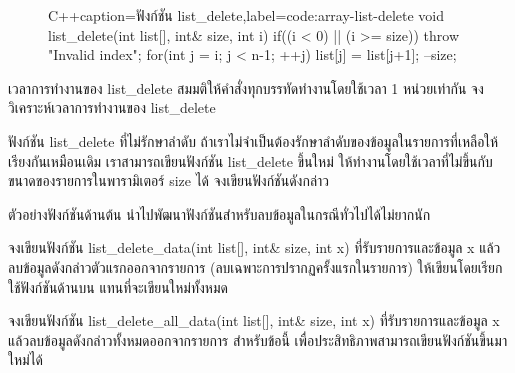 \begin{figure}
\latintext
\begin{codelist}{C++}{caption={\thaitext ฟังก์ชัน {\ct list\_delete}\latintext},label=code:array-list-delete}
void list_delete(int list[], int& size, int i)
{
  if((i < 0) || (i >= size))
    throw "Invalid index";
  for(int j = i; j < n-1; ++j)
    list[j] = list[j+1];
  --size;
}
\end{codelist}
\thaitext
\end{figure}

\begin{quiz}{เวลา{\wbr}การ{\wbr}ทำงาน{\wbr}ของ {\ct list\_delete}}
สมมติ{\wbr}ให้{\wbr}คำ{\wbr}สั่ง{\wbr}ทุก{\wbr}บรรทัด{\wbr}ทำงาน{\wbr}โดย{\wbr}ใช้{\wbr}เวลา 1 หน่วย{\wbr}เท่า{\wbr}กัน จง{\wbr}วิเคราะห์{\wbr}เวลา{\wbr}การ{\wbr}ทำงาน{\wbr}ของ{\wbr}
{\ct list\_delete} 
\end{quiz}

\begin{quiz}{ฟังก์ชัน {\ct list\_delete} ที่{\wbr}ไม่{\wbr}รักษา{\wbr}ลำดับ}
ถ้า{\wbr}เรา{\wbr}ไม่{\wbr}จำเป็น{\wbr}ต้อง{\wbr}รักษา{\wbr}ลำดับ{\wbr}ของ{\wbr}ข้อมูล{\wbr}ใน{\wbr}รายการ{\wbr}ที่{\wbr}เหลือ{\wbr}ให้{\wbr}เรียง{\wbr}กัน{\wbr}เหมือน{\wbr}เดิม{\wbr}
เรา{\wbr}สามารถ{\wbr}เขียน{\wbr}ฟังก์ชัน {\ct list\_delete} ขึ้น{\wbr}ใหม่{\wbr}
ให้{\wbr}ทำงาน{\wbr}โดย{\wbr}ใช้{\wbr}เวลา{\wbr}ที่{\wbr}ไม่{\wbr}ขึ้น{\wbr}กับ{\wbr}ขนาด{\wbr}ของ{\wbr}รายการ{\wbr}ใน{\wbr}พารามิเตอร์ {\ct size} ได้{\wbr}
จง{\wbr}เขียน{\wbr}ฟังก์ชัน{\wbr}ดัง{\wbr}กล่าว{\wbr}
\end{quiz}

ตัวอย่าง{\wbr}ฟังก์ชัน{\wbr}ด้าน{\wbr}ต้น นำ{\wbr}ไป{\wbr}พัฒนา{\wbr}ฟังก์ชัน{\wbr}สำหรับ{\wbr}ลบ{\wbr}ข้อมูล{\wbr}ใน{\wbr}กรณี{\wbr}ทั่วไป{\wbr}ได้{\wbr}ไม่{\wbr}ยาก{\wbr}นัก{\wbr}

\begin{quiz}{}
จง{\wbr}เขียน{\wbr}ฟังก์ชัน {\ct list\_delete\_data(int list[], int\& size, int x)}
ที่{\wbr}รับ{\wbr}รายการ{\wbr}และ{\wbr}ข้อมูล {\ct x} แล้ว{\wbr}ลบ{\wbr}ข้อมูล{\wbr}ดัง{\wbr}กล่าว{\wbr}ตัว{\wbr}แรก{\wbr}ออก{\wbr}จาก{\wbr}รายการ{\wbr}
(ลบ{\wbr}เฉพาะ{\wbr}การ{\wbr}ปรากฏ{\wbr}ครั้ง{\wbr}แรก{\wbr}ใน{\wbr}รายการ)  ให้{\wbr}เขียน{\wbr}โดย{\wbr}เรียก{\wbr}ใช้{\wbr}ฟังก์ชัน{\wbr}ด้าน{\wbr}บน แทน{\wbr}ที่{\wbr}จะ{\wbr}เขียน{\wbr}ใหม่{\wbr}ทั้งหมด{\wbr}
\end{quiz}

\begin{quiz}{}
จง{\wbr}เขียน{\wbr}ฟังก์ชัน {\ct list\_delete\_all\_data(int list[], int\& size, int
  x)} ที่{\wbr}รับ{\wbr}รายการ{\wbr}และ{\wbr}ข้อมูล {\ct x} แล้ว{\wbr}ลบ{\wbr}ข้อมูล{\wbr}ดัง{\wbr}กล่าว{\wbr}ทั้งหมด{\wbr}ออก{\wbr}จาก{\wbr}รายการ{\wbr}
สำหรับ{\wbr}ข้อ{\wbr}นี้ เพื่อ{\wbr}ประสิทธิภาพ{\wbr}สามารถ{\wbr}เขียน{\wbr}ฟังก์ชัน{\wbr}ขึ้น{\wbr}มา{\wbr}ใหม่{\wbr}ได้{\wbr}
\end{quiz}

